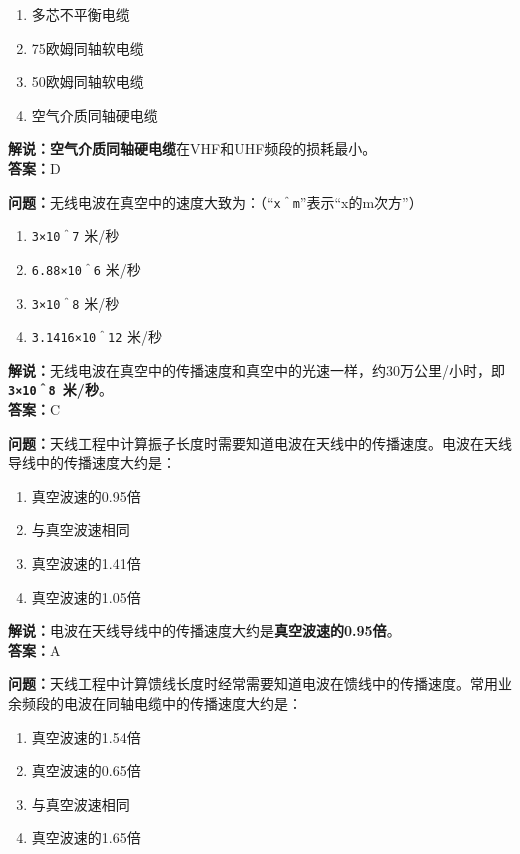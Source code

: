 \begin{enumerate}[label=\Alph*), leftmargin=1.5cm]
	\item 多芯不平衡电缆
	\item 75欧姆同轴软电缆
	\item 50欧姆同轴软电缆
	\item 空气介质同轴硬电缆
\end{enumerate}

\textbf{解说：}\textbf{空气介质同轴硬电缆}在VHF和UHF频段的损耗最小。\\\textbf{答案：}D



\textbf{问题：}无线电波在真空中的速度大致为：（“\texttt{x＾m}”表示“x的m次方”）

\begin{enumerate}[label=\Alph*), leftmargin=1.5cm]
	\item \texttt{3×10＾7} 米/秒
	\item \texttt{6.88×10＾6} 米/秒
	\item \texttt{3×10＾8} 米/秒
	\item \texttt{3.1416×10＾12} 米/秒
\end{enumerate}

\textbf{解说：}无线电波在真空中的传播速度和真空中的光速一样，约30万公里/小时，即\textbf{\texttt{3×10＾8 }米/秒}。\\\textbf{答案：}C



\textbf{问题：}天线工程中计算振子长度时需要知道电波在天线中的传播速度。电波在天线导线中的传播速度大约是：

\begin{enumerate}[label=\Alph*), leftmargin=1.5cm]
	\item 真空波速的0.95倍
	\item 与真空波速相同
	\item 真空波速的1.41倍
	\item 真空波速的1.05倍
\end{enumerate}

\textbf{解说：}电波在天线导线中的传播速度大约是\textbf{真空波速的0.95倍}。\\\textbf{答案：}A



\textbf{问题：}天线工程中计算馈线长度时经常需要知道电波在馈线中的传播速度。常用业余频段的电波在同轴电缆中的传播速度大约是：

\begin{enumerate}[label=\Alph*), leftmargin=1.5cm]
	\item 真空波速的1.54倍
	\item 真空波速的0.65倍
	\item 与真空波速相同
	\item 真空波速的1.65倍
\end{enumerate}

